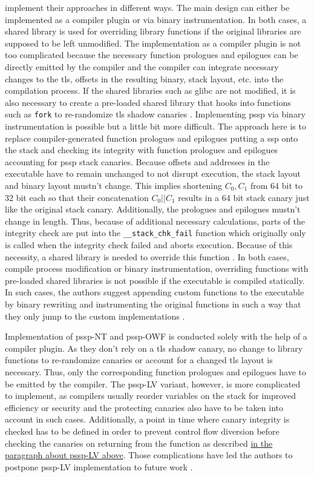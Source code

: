 \bigskip\noindent
{} implement their approaches in different ways.
The main design can either be implemented as a compiler plugin or via binary instrumentation.
In both cases, a shared library is used for overriding library functions if the original libraries are supposed to be left unmodified.
The implementation as a compiler plugin is not too complicated because the necessary function prologues and epilogues can be directly emitted by the compiler and the compiler can integrate necessary changes to the \gls{tls}, offsets in the resulting binary, stack layout, etc. into the compilation process.
If the shared libraries such as \gls{glibc} are not modified, it is also necessary to create a pre-loaded shared library that hooks into functions such as \texttt{fork} to re-randomize \acs{tls} shadow canaries \cite[248\psq]{Wang2018}.
Implementing \gls{pssp} via binary instrumentation is possible but a little bit more difficult.
The approach here is to replace compiler-generated function prologues and epilogues putting a \gls{ssp} onto the stack and checking its integrity with function prologues and epilogues accounting for \gls{pssp} stack canaries.
Because offsets and addresses in the executable have to remain unchanged to not disrupt execution, the stack layout and binary layout mustn't change.
This implies shortening $ C_0, C_1 $ from 64 bit to 32 bit each so that their concatenation $ C_0 || C_1 $ results in a 64 bit stack canary just like the original stack canary.
Additionally, the prologues and epilogues mustn't change in length.
Thus, because of additional necessary calculations, parts of the integrity check are put into the \texttt{\_\_stack\_chk\_fail} function which originally only is called when the integrity check failed and aborts execution.
Because of this necessity, a shared library is needed to override this function \cite[249\psq]{Wang2018}.
In both cases, compile process modification or binary instrumentation, overriding functions with pre-loaded shared libraries is not possible if the executable is compiled statically.
In such cases, the authors suggest appending custom functions to the executable by binary rewriting and instrumenting the original functions in such a way that they only jump to the custom implementations \cite[250]{Wang2018}.

Implementation of \acs{pssp}-NT and \acs{pssp}-OWF is conducted solely with the help of a compiler plugin.
As they don't rely on a \acs{tls} shadow canary, no change to library functions to re-randomize canaries or account for a changed \gls{tls} layout is necessary.
Thus, only the corresponding function prologues and epilogues have to be emitted by the compiler.
The \acs{pssp}-LV variant, however, is more complicated to implement, as compilers usually reorder variables on the stack for improved efficiency or security and the protecting canaries also have to be taken into account in such cases.
Additionally, a point in time where canary integrity is checked has to be defined in order to prevent control flow diversion before checking the canaries on returning from the function as described \hyperref[subsubsec:p-ssp-lv]{in the paragraph about \acs{pssp}-LV above}.
Those complications have led the authors to postpone \acs{pssp}-LV implementation to future work \cite[250\psq]{Wang2018}.

